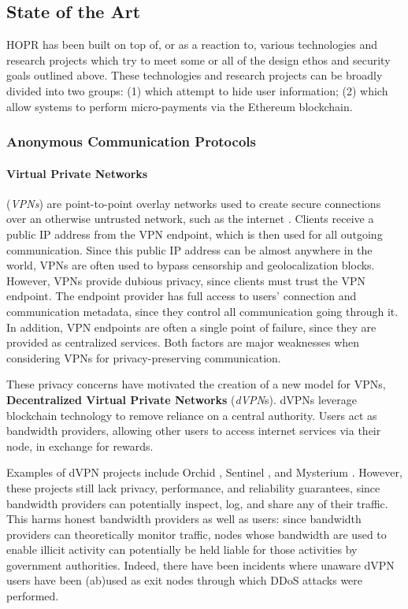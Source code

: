 \subsection{State of the Art}
\label{sec:stateoftheart}

HOPR has been built on top of, or as a reaction to, various technologies and research projects which try to meet some or all of the design ethos and security goals outlined above. These technologies and research projects can be broadly divided into two groups: (1)  which attempt
to hide user information; (2)  which allow systems
to perform micro-payments via the Ethereum blockchain.

\subsubsection{Anonymous Communication Protocols}
\label{sec:privacyprotocols}

\paragraph{Virtual Private Networks}(\textit{VPNs}) are point-to-point
overlay networks used to create secure connections over an otherwise
untrusted network, such as the internet \cite{venkateswaran_2001}. Clients receive a public IP address from the VPN endpoint, which is then used
for all outgoing communication. Since this public IP address can be almost anywhere in the world, VPNs are often
used to bypass censorship \cite{hobbs_roberts_2018} and geolocalization blocks. However, VPNs provide dubious privacy, since clients must trust the VPN
endpoint. The endpoint provider has full access to users' connection and
communication metadata, since they control all communication going through it. In addition, VPN
endpoints are often a single point of failure, since they are provided as
centralized services. Both factors are major weaknesses when
considering VPNs for privacy-preserving communication.

These privacy concerns have motivated the creation of a new model for VPNs,
\textbf{Decentralized Virtual Private Networks} (\textit{dVPN}s). dVPNs leverage blockchain technology to remove reliance on a central authority. Users act as bandwidth providers, allowing other users to access internet services via their node, in exchange for rewards. 

Examples of dVPN projects include Orchid \cite{orchid}, Sentinel \cite{sentinel}, and Mysterium \cite{mysterium}. However, these projects still lack privacy, performance, and reliability guarantees, since bandwidth providers can potentially inspect, log, and share any of their traffic. This harms honest bandwidth providers as well as users: since bandwidth providers can theoretically monitor traffic, nodes whose bandwidth are used to enable illicit activity can potentially be held liable for those activities by government authorities. Indeed, there have been incidents where unaware dVPN users have been (ab)used as exit nodes through which DDoS attacks
were performed. 

